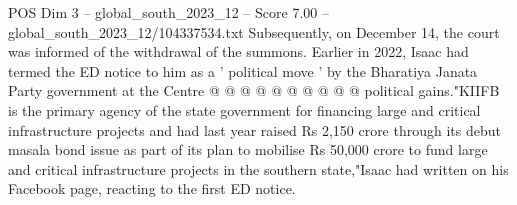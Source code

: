 \begin{textsample}{POS Dim 3 – global\_south\_2023\_12 – Score 7.00 – global\_south\_2023\_12/104337534.txt}
Subsequently, on December 14, the court was informed of the withdrawal of the summons.
Earlier in 2022, Isaac had termed the ED notice to him as a ' political move ' by the Bharatiya Janata Party government at the Centre @ @ @ @ @ @ @ @ @ @ political gains."KIIFB is the primary agency of the state government for financing large and critical infrastructure projects and had last year raised Rs 2,150 crore through its debut masala bond issue as part of its plan to mobilise Rs 50,000 crore to fund large and critical infrastructure projects in the southern state,"Isaac had written on his Facebook page, reacting to the first ED notice.

\end{textsample}
